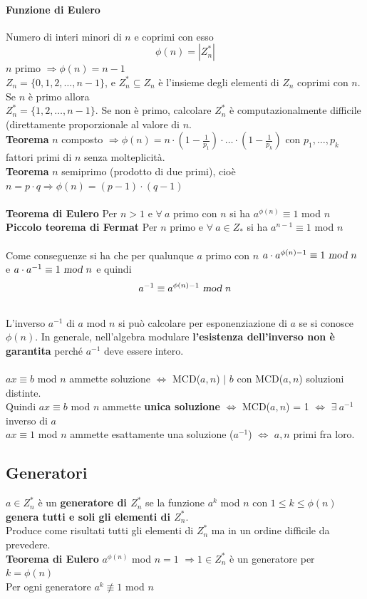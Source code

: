 \documentclass[10pt]{book}
\begin{document}
\paragraph{Funzione di Eulero} Numero di interi minori di $n$ e coprimi con esso $$\phi(n) = |Z_n^*|$$ $n$ primo $\Rightarrow \phi(n) = n - 1$\\
$Z_n = \{0, 1, 2, \ldots, n-1\}$, e $Z_n^*\subseteq Z_n$ è l'insieme degli elementi di $Z_n$ coprimi con $n$. Se $n$ è primo allora\\ $Z_n^* = \{1, 2, \ldots, n-1\}$. Se non è primo, calcolare $Z_n^*$ è computazionalmente difficile (direttamente proporzionale al valore di $n$.\\
\textbf{Teorema} $n$ composto $\Rightarrow \phi(n) = n\cdot(1 - \frac{1}{p_1})\cdot\ldots\cdot(1 - \frac{1}{p_k})$ con $p_1,\ldots,p_k$ fattori primi di $n$ senza molteplicità.\\
\textbf{Teorema} $n$ semiprimo (prodotto di due primi), cioè $n = p\cdot q \Rightarrow \phi(n) = (p-1)\cdot(q-1)$\\\\
\textbf{Teorema di Eulero} Per $n > 1$ e $\forall\:a$ primo con $n$ si ha $a^{\phi(n)} \equiv 1$ mod $n$\\
\textbf{Piccolo teorema di Fermat} Per $n$ primo e $\forall\:a\in Z_*$ si ha $a^{n-1} \equiv 1$ mod $n$\\\\
Come conseguenze si ha che per qualunque $a$ primo con $n$ $a \cdot a^{\phi(n)-1} \equiv 1\textsl{ mod }n$ e $a\cdot a^{-1} \equiv 1\textsl{ mod }n$ e quindi $$a^{-1} \equiv a^{\phi(n)-1}\textsl{ mod }n$$\\
L'inverso $a^{-1}$ di $a$ mod $n$ si può calcolare per esponenziazione di $a$ se si conosce $\phi(n)$. In generale, nell'algebra modulare \textbf{l'esistenza dell'inverso non è garantita} perché $a^{-1}$ deve essere intero.\\\\
$ax \equiv b$ mod $n$ ammette soluzione $\Leftrightarrow$ MCD($a, n$) $|$ $b$ con MCD($a, n$) soluzioni distinte.\\
Quindi $ax \equiv b$ mod $n$ ammette \textbf{unica soluzione} $\Leftrightarrow$ MCD($a,n$) = 1 $\Leftrightarrow$ $\exists\:a^{-1}$ inverso di $a$\\
$ax \equiv 1$ mod $n$ ammette esattamente una soluzione ($a^{-1}$) $\Leftrightarrow$ $a,n$ primi fra loro.
\subsection{Generatori}
$a\in Z_n^*$ è un \textbf{generatore di $Z_n^*$} se la funzione $a^k$ mod $n$ con $1 \leq k \leq \phi(n)$ \textbf{genera tutti e soli gli elementi di $Z_n^*$}.\\
Produce come risultati tutti gli elementi di $Z_n^*$ ma in un ordine difficile da prevedere.\\
\textbf{Teorema di Eulero} $a^{\phi(n)}$ mod $n = 1$ $\Rightarrow 1\in Z_n^*$ è un generatore per $k = \phi(n)$\\
Per ogni generatore $a^k\not\equiv1$ mod $n$
\end{document}
